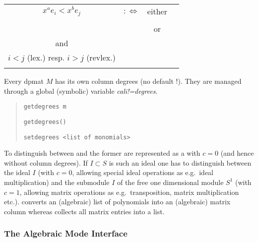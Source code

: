 \begin{tabular}{cccp{6cm}}
$x^ae_i<x^be_j$ & $:\Leftrightarrow$ & either &
{\centering $x^ax^{a_i}<x^bx^{a_j}$ in $S$\\}\\ 
& & or &
{\centering $x^ax^{a_i}=x^bx^{a_j}$ \\ and \\
$i<j$ (lex.) resp. $i>j$ (revlex.)\\}
\end{tabular}

Every dpmat $M$ has its own column degrees (no default !).  They are
managed through a global (symbolic) variable 
\emph{cali!=degrees}.
\begin{quote}
\verb|getdegrees m| 


\verb|getdegrees()| 


\verb|setdegrees <list of monomials>|  

\end{quote}

To distinguish between  and  the former are
represented as a  with $c=0$ (and hence without column
degrees).  If $I \subset S$ is such an ideal one has to distinguish
between the ideal $I$ (with $c=0$, allowing special ideal operations
as e.g.\ ideal multiplication) and the submodule $I$ of the free
one dimensional module $S^1$ (with $c=1$, allowing matrix operations
as e.g.\  transposition, matrix multiplication etc.). 
converts an (algebraic) list of polynomials into an (algebraic)
matrix column whereas  collects all matrix entries into
a list.

\subsubsection{The Algebraic Mode Interface}

